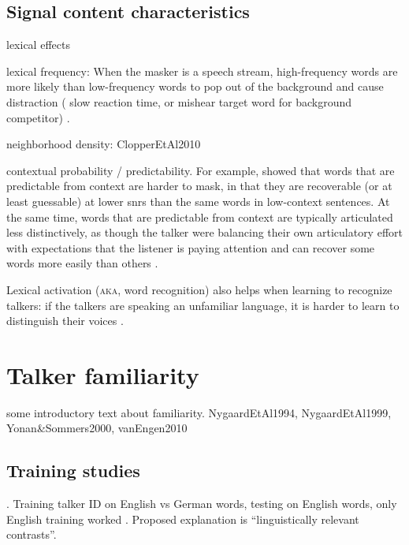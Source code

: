\subsection{Signal content characteristics}
\begin{itm}
	\item{lexical effects \citep{HoenEtAl2007, BoulengerEtAl2010, BrouwerEtAl2012}}
	\item{lexical frequency: When the masker is a speech stream, high-frequency words are more likely than low-frequency words to pop out of the background and cause distraction (\ie{} slow reaction time, or mishear target word for background competitor) \citep{BoulengerEtAl2010}.}
	\item{neighborhood density: ClopperEtAl2010}
	\item{contextual probability / predictability.  For example, \citet{LewisEtAl1988} showed that words that are predictable from context are harder to mask, in that they are recoverable (or at least guessable) at lower \ac{snr}s than the same words in low-context sentences.  At the same time, words that are predictable from context are typically articulated less distinctively, as though the talker were balancing their own articulatory effort with expectations that the listener is paying attention and can recover some words more easily than others \citep{Wright2004a}.  }
	\item{Lexical activation (\textsc{aka}, word recognition) also helps when learning to recognize talkers: if the talkers are speaking an unfamiliar language, it is harder to learn to distinguish their voices \citep{PerrachioneWong2007}.}
\end{itm}




\section{Talker familiarity\label{sec:Fam}}
some introductory text about familiarity.  NygaardEtAl1994, NygaardEtAl1999, Yonan\&Sommers2000, vanEngen2010

\subsection{Training studies\label{sec:Training}}
\citep{VanEngen2012}.  
Training talker ID on English vs German words, testing on English words, only English training worked \citep{LeviEtAl2011}.  Proposed explanation is “linguistically relevant contrasts”.

